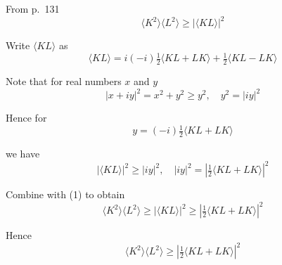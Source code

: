 


\bigskip
From p.~131
\begin{equation*}
\langle K^2\rangle\langle L^2\rangle
\ge|\langle KL\rangle|^2
\tag{1}
\end{equation*}

Write $\langle KL\rangle$ as
\begin{equation*}
\langle KL\rangle=i(-i)\tfrac{1}{2}\langle KL+LK\rangle+\tfrac{1}{2}\langle KL-LK\rangle
\end{equation*}

Note that for real numbers $x$ and $y$
\begin{equation*}
|x+iy|^2=x^2+y^2\ge y^2,\quad y^2=|iy|^2
\end{equation*}

Hence for
\begin{equation*}
y=(-i)\tfrac{1}{2}\langle KL+LK\rangle
\end{equation*}

we have
\begin{equation*}
|\langle KL\rangle|^2\ge|iy|^2,\quad|iy|^2=\left|\tfrac{1}{2}\langle KL+LK\rangle\right|^2
\end{equation*}

Combine with (1) to obtain
\begin{equation*}
\langle K^2\rangle\langle L^2\rangle\ge|\langle KL\rangle|^2
\ge\left|\tfrac{1}{2}\langle KL+LK\rangle\right|^2
\end{equation*}

Hence
\begin{equation*}
\langle K^2\rangle\langle L^2\rangle\ge\left|\tfrac{1}{2}\langle KL+LK\rangle\right|^2
\end{equation*}


